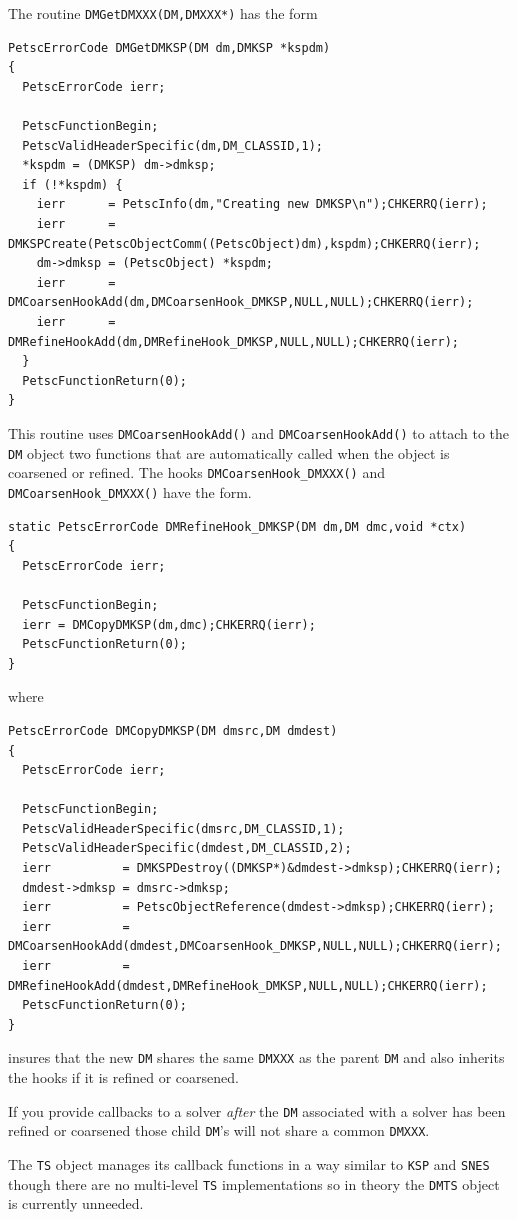 The routine \lstinline{DMGetDMXXX(DM,DMXXX*)} has the form
\begin{lstlisting}
PetscErrorCode DMGetDMKSP(DM dm,DMKSP *kspdm)
{
  PetscErrorCode ierr;

  PetscFunctionBegin;
  PetscValidHeaderSpecific(dm,DM_CLASSID,1);
  *kspdm = (DMKSP) dm->dmksp;
  if (!*kspdm) {
    ierr      = PetscInfo(dm,"Creating new DMKSP\n");CHKERRQ(ierr);
    ierr      = DMKSPCreate(PetscObjectComm((PetscObject)dm),kspdm);CHKERRQ(ierr);
    dm->dmksp = (PetscObject) *kspdm;
    ierr      = DMCoarsenHookAdd(dm,DMCoarsenHook_DMKSP,NULL,NULL);CHKERRQ(ierr);
    ierr      = DMRefineHookAdd(dm,DMRefineHook_DMKSP,NULL,NULL);CHKERRQ(ierr);
  }
  PetscFunctionReturn(0);
}
\end{lstlisting}
This routine uses \lstinline{DMCoarsenHookAdd()} and \lstinline{DMCoarsenHookAdd()} to attach to the \lstinline{DM} object two functions that are automatically called when the object is coarsened or refined.
The hooks \lstinline{DMCoarsenHook_DMXXX()} and \lstinline{DMCoarsenHook_DMXXX()} have the form.
\begin{lstlisting}
static PetscErrorCode DMRefineHook_DMKSP(DM dm,DM dmc,void *ctx)
{
  PetscErrorCode ierr;

  PetscFunctionBegin;
  ierr = DMCopyDMKSP(dm,dmc);CHKERRQ(ierr);
  PetscFunctionReturn(0);
}
\end{lstlisting}
where
\begin{lstlisting}
PetscErrorCode DMCopyDMKSP(DM dmsrc,DM dmdest)
{
  PetscErrorCode ierr;

  PetscFunctionBegin;
  PetscValidHeaderSpecific(dmsrc,DM_CLASSID,1);
  PetscValidHeaderSpecific(dmdest,DM_CLASSID,2);
  ierr          = DMKSPDestroy((DMKSP*)&dmdest->dmksp);CHKERRQ(ierr);
  dmdest->dmksp = dmsrc->dmksp;
  ierr          = PetscObjectReference(dmdest->dmksp);CHKERRQ(ierr);
  ierr          = DMCoarsenHookAdd(dmdest,DMCoarsenHook_DMKSP,NULL,NULL);CHKERRQ(ierr);
  ierr          = DMRefineHookAdd(dmdest,DMRefineHook_DMKSP,NULL,NULL);CHKERRQ(ierr);
  PetscFunctionReturn(0);
}
\end{lstlisting}
insures that the new \lstinline{DM} shares the same \lstinline{DMXXX} as the parent \lstinline{DM} and also inherits the hooks if it is refined or coarsened.

If you provide callbacks to a solver {\em after} the \lstinline{DM} associated with a solver has been refined or coarsened those child \lstinline{DM}'s will not share a common \lstinline{DMXXX}.

The \lstinline{TS} object manages its callback functions in a way similar to \lstinline{KSP}
and \lstinline{SNES} though there are no multi-level \lstinline{TS} implementations so in
theory the \lstinline{DMTS} object is currently unneeded.


